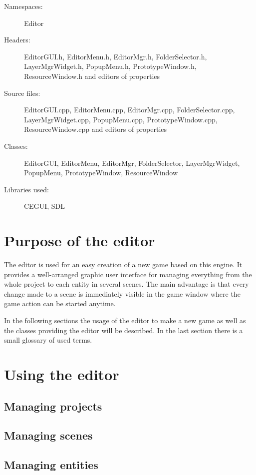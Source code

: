 \begin{description}
  \item[Namespaces:] Editor
  \item[Headers:] EditorGUI.h, EditorMenu.h, EditorMgr.h, FolderSelector.h, LayerMgrWidget.h, PopupMenu.h, PrototypeWindow.h, ResourceWindow\-.h and editors of properties
  \item[Source files:] EditorGUI.cpp, EditorMenu.cpp, EditorMgr.cpp, FolderSelector.cpp, LayerMgrWidget.cpp, PopupMenu.cpp, PrototypeWindow\-.cpp, ResourceWindow.cpp and editors of properties
  \item[Classes:] EditorGUI, EditorMenu, EditorMgr, FolderSelector, LayerMgrWidget, PopupMenu, PrototypeWindow, ResourceWindow
  \item[Libraries used:] CEGUI, SDL
\end{description}

\section{Purpose of the editor}

The editor is used for an easy creation of a new game based on this engine. It provides a well-arranged graphic user interface for managing everything from the whole project to each entity in several scenes. The main advantage is that every change made to a scene is immediately visible in the game window where the game action can be started anytime.

In the following sections the usage of the editor to make a new game as well as the classes providing the editor will be described. In the last section there is a small glossary of used terms.

\section{Using the editor}

\subsection{Managing projects}

\subsection{Managing scenes}

\subsection{Managing entities}

